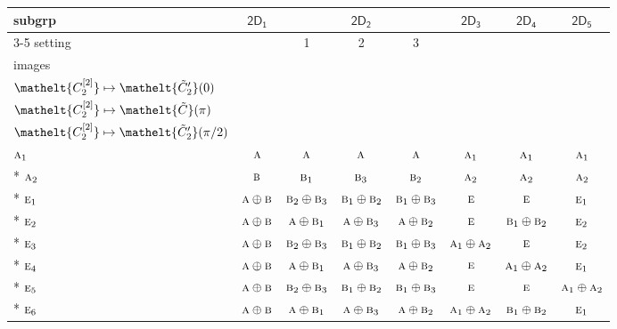 \documentclass[10pt,a4paper]{article}
\numberwithin{equation}{section}
\newcommand{\eltfont}[1]{{\let\sigma\eltsigma\mathelt{#1}}}
\newcommand{\grp}[1]{\mathsf{#1}}
\newcommand{\irr}[1]{\text{\normalfont\scshape #1}}
\newcommand{\cls}[1]{\eltfont{#1}}
\newcommand{\elt}[1]{\eltfont{#1}}
\newcommand{\genidx}[2]{#1^{[\mathrm{#2}]}}
\newcommand{\lift}[1]{\tilde{#1}}
\begin{document}
{\small\begin{longtable}{@{}lccccccc@{}}\toprule
subgrp & \href{2D1.pdf}{$\grp{2D_{1}}$} & \multicolumn{3}{c}{\href{2D2.pdf}{$\grp{2D_{2}}$}} & \href{2D3.pdf}{$\grp{2D_{3}}$} & \href{2D4.pdf}{$\grp{2D_{4}}$} & \href{2D5.pdf}{$\grp{2D_{5}}$}\\\cmidrule(lr){3-5}
setting &  & 1 & 2 & 3 &  &  & \\
images &  & {\scriptsize\begin{tabular}[t]{@{}c@{}}$\cls{\genidx{C_{2}}{1}} \mapsto \elt{\lift{C}}(\pi)$\\$\cls{\genidx{C_{2}}{2}} \mapsto \elt{\lift{C}_2'}(0)$\end{tabular}} & {\scriptsize\begin{tabular}[t]{@{}c@{}}$\cls{\genidx{C_{2}}{1}} \mapsto \elt{\lift{C}_2'}(0)$\\$\cls{\genidx{C_{2}}{2}} \mapsto \elt{\lift{C}}(\pi)$\end{tabular}} & {\scriptsize\begin{tabular}[t]{@{}c@{}}$\cls{\genidx{C_{2}}{1}} \mapsto \elt{\lift{C}_2'}(0)$\\$\cls{\genidx{C_{2}}{2}} \mapsto \elt{\lift{C}_2'}(\pi/2)$\end{tabular}} &  &  & \\\midrule\endhead
\bottomrule\endfoot\endlastfoot
$\irr{a}_{1}$ & $\irr{a}$ & $\irr{a}$ & $\irr{a}$ & $\irr{a}$ & $\irr{a}_{1}$ & $\irr{a}_{1}$ & $\irr{a}_{1}$\\*
$\irr{a}_{2}$ & $\irr{b}$ & $\irr{b}_{1}$ & $\irr{b}_{3}$ & $\irr{b}_{2}$ & $\irr{a}_{2}$ & $\irr{a}_{2}$ & $\irr{a}_{2}$\\*
$\irr{e}_{1}$ & $\irr{a}\oplus \irr{b}$ & $\irr{b}_{2}\oplus \irr{b}_{3}$ & $\irr{b}_{1}\oplus \irr{b}_{2}$ & $\irr{b}_{1}\oplus \irr{b}_{3}$ & $\irr{e}$ & $\irr{e}$ & $\irr{e}_{1}$\\*
$\irr{e}_{2}$ & $\irr{a}\oplus \irr{b}$ & $\irr{a}\oplus \irr{b}_{1}$ & $\irr{a}\oplus \irr{b}_{3}$ & $\irr{a}\oplus \irr{b}_{2}$ & $\irr{e}$ & $\irr{b}_{1}\oplus \irr{b}_{2}$ & $\irr{e}_{2}$\\*
$\irr{e}_{3}$ & $\irr{a}\oplus \irr{b}$ & $\irr{b}_{2}\oplus \irr{b}_{3}$ & $\irr{b}_{1}\oplus \irr{b}_{2}$ & $\irr{b}_{1}\oplus \irr{b}_{3}$ & $\irr{a}_{1}\oplus \irr{a}_{2}$ & $\irr{e}$ & $\irr{e}_{2}$\\*
$\irr{e}_{4}$ & $\irr{a}\oplus \irr{b}$ & $\irr{a}\oplus \irr{b}_{1}$ & $\irr{a}\oplus \irr{b}_{3}$ & $\irr{a}\oplus \irr{b}_{2}$ & $\irr{e}$ & $\irr{a}_{1}\oplus \irr{a}_{2}$ & $\irr{e}_{1}$\\*
$\irr{e}_{5}$ & $\irr{a}\oplus \irr{b}$ & $\irr{b}_{2}\oplus \irr{b}_{3}$ & $\irr{b}_{1}\oplus \irr{b}_{2}$ & $\irr{b}_{1}\oplus \irr{b}_{3}$ & $\irr{e}$ & $\irr{e}$ & $\irr{a}_{1}\oplus \irr{a}_{2}$\\*
$\irr{e}_{6}$ & $\irr{a}\oplus \irr{b}$ & $\irr{a}\oplus \irr{b}_{1}$ & $\irr{a}\oplus \irr{b}_{3}$ & $\irr{a}\oplus \irr{b}_{2}$ & $\irr{a}_{1}\oplus \irr{a}_{2}$ & $\irr{b}_{1}\oplus \irr{b}_{2}$ & $\irr{e}_{1}$\\
\bottomrule\end{longtable}}
\end{document}
